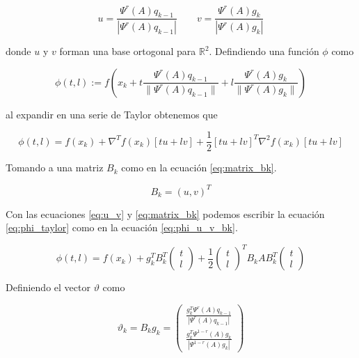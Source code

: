 \begin{equation}
    u = \frac{\Psi^r(A)q_{k-1}}{|\Psi^r(A)q_{k-1}|} \qquad
    v = \frac{\Psi^r(A)g_{k}}{|\Psi^r(A)g_{k}|} \label{eq:u_v}
\end{equation}

donde $u$ y $v$ forman una base ortogonal para $\mathbb{R}^2$. Defindiendo una función $\phi$ como

\begin{equation}
    \phi(t,l):=f\left(x_k+t\frac{\Psi^r(A)q_{k-1}}{\|\Psi^r(A)q_{k-1}\|} + l \frac{\Psi^r(A)g_{k}}{\|\Psi^r(A)g_{k}\|}\right) \label{eq:phi_definition}
\end{equation}

al expandir en una serie de Taylor obtenemos que

\begin{equation}
    \phi(t,l) = f(x_k)+\nabla^T f(x_k) \left[tu+lv \right] + \frac{1}{2}\left[tu+ lv \right]^T\nabla^2 f(x_k) \left[tu+lv \right] \label{eq:phi_taylor}
\end{equation}

Tomando a una matriz $B_k$ como en la ecuación \ref{eq:matrix_bk}.

\begin{equation}
    B_k =  \left(u, v\right)^T \label{eq:matrix_bk}
\end{equation}

Con las ecuaciones \ref{eq:u_v} y \ref{eq:matrix_bk} podemos escribir la ecuación \ref{eq:phi_taylor} como en la ecuación \ref{eq:phi_u_v_bk}.

\begin{equation}
    \phi(t, l) =  f(x_k)+g_k^TB_k^T\begin{pmatrix}t\\l\end{pmatrix} +\frac{1}{2}\begin{pmatrix}t\\l\end{pmatrix}^TB_k A B_k^T\begin{pmatrix}t\\l\end{pmatrix} \label{eq:phi_u_v_bk}
\end{equation}

Definiendo el vector $\vartheta$ como

\begin{equation}
    \vartheta_k = B_kg_k =
    \begin{pmatrix}
        \frac{g_k^T\Psi^r(A)q_{k-1}}{|\Psi^{r}(A)q_{k-1}|} \\[0.25cm]
        \frac{g_k^T\Psi^{1-r}(A)g_k}{|\Psi^{1-r}(A)g_k|}
    \end{pmatrix}
    \label{eq:vartheta_k}
\end{equation}

